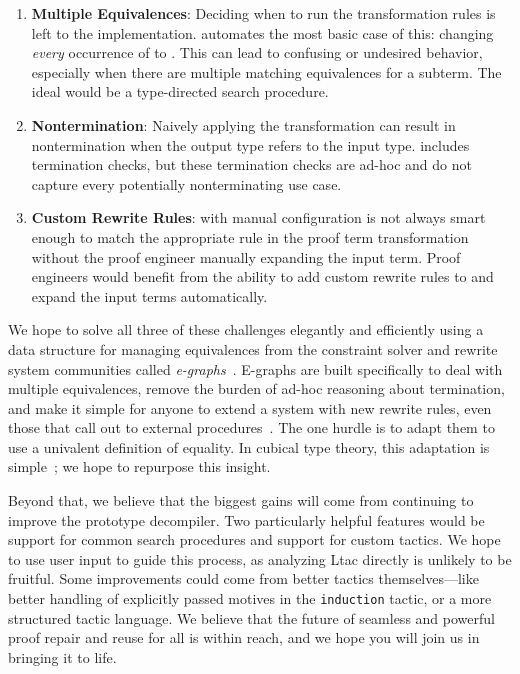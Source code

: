 \begin{enumerate}
\item \textbf{Multiple Equivalences}: Deciding when to run the transformation rules is left to the implementation.
\toolname automates the most basic case of this: changing \textit{every} occurrence of \A to \B.
This can lead to confusing or undesired behavior, especially when there are multiple matching equivalences for a subterm.
The ideal would be a type-directed search procedure.
\item \textbf{Nontermination}: Naively applying the transformation can result in nontermination when the output type refers to the input type.
\toolname includes termination checks, but these termination checks are ad-hoc and do not capture every potentially nonterminating use case.
\item \textbf{Custom Rewrite Rules}: \toolname with manual configuration is not always smart enough to match the appropriate rule in the proof term
transformation without the proof engineer manually expanding the input term.
Proof engineers would benefit from the ability to add custom rewrite rules to \toolname
and expand the input terms automatically.
\end{enumerate}
We hope to solve all three of these challenges elegantly and efficiently using a
data structure for managing equivalences from the constraint solver and rewrite system communities
called \textit{e-graphs}~\cite{egraph1}.
E-graphs are built specifically to deal with multiple equivalences,
remove the burden of ad-hoc reasoning about termination,
and make it simple for anyone to extend a system with new
rewrite rules, even those that call out
to external procedures~\cite{egraph5}.
The one hurdle is to adapt them to use a univalent definition of equality.
In cubical type theory, this adaptation is simple~\cite{egraph6}; we hope to repurpose this insight.

Beyond that, we believe that the biggest gains will come from continuing to improve the prototype decompiler.
Two particularly helpful features would be support for common search procedures and support for custom tactics.
We hope to use user input to guide this process, as analyzing Ltac directly is unlikely to be fruitful.
Some improvements could come from better tactics themselves---like better handling of explicitly passed 
motives in the \lstinline{induction} tactic, or a more structured tactic language.
We believe that the future of seamless and powerful proof repair and reuse for all is within reach,
and we hope you will join us in bringing it to life.



